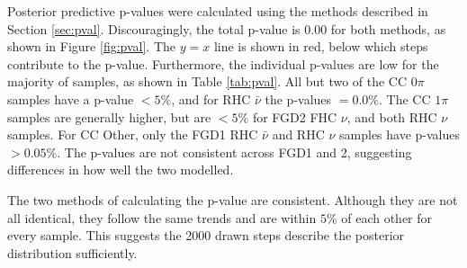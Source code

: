 Posterior predictive p-values were calculated using the methods described in Section \ref{sec:pval}. Discouragingly, the total p-value is 0.00 for both methods, as shown in Figure \ref{fig:pval}. The $y=x$ line is shown in red, below which steps contribute to the p-value. Furthermore, the individual p-values are low for the majority of samples, as shown in Table \ref{tab:pval}. All but two of the CC 0$\pi$ samples have a p-value $<5\%$, and for RHC $\bar{\nu}$ the p-values $=0.0\%$. The CC $1\pi$ samples are generally higher, but are $<5\%$ for FGD2 FHC $\nu$, and both RHC $\nu$ samples. For CC Other, only the FGD1 RHC $\bar{\nu}$ and RHC $\nu$ samples have p-values $>0.05\%$. The p-values are not consistent across FGD1 and 2, suggesting differences in how well the two modelled.

The two methods of calculating the p-value are consistent. Although they are not all identical, they follow the same trends and are within $5\%$ of each other for every sample. This suggests the 2000 drawn steps describe the posterior distribution sufficiently.

